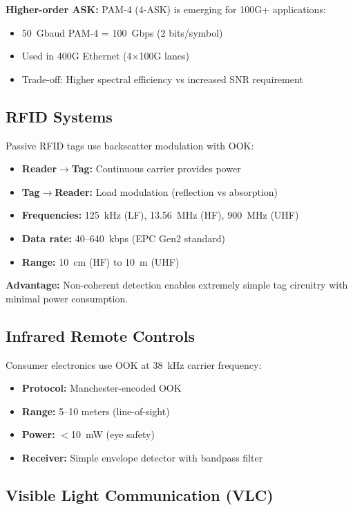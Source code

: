 \textbf{Higher-order ASK:} PAM-4 (4-ASK) is emerging for 100G+ applications:
\begin{itemize}
\item 50~Gbaud PAM-4 = 100~Gbps (2 bits/symbol)
\item Used in 400G Ethernet (4$\times$100G lanes)
\item Trade-off: Higher spectral efficiency vs increased SNR requirement
\end{itemize}

\subsection{RFID Systems}

Passive RFID tags use backscatter modulation with OOK:

\begin{itemize}
\item \textbf{Reader$\rightarrow$Tag:} Continuous carrier provides power
\item \textbf{Tag$\rightarrow$Reader:} Load modulation (reflection vs absorption)
\item \textbf{Frequencies:} 125~kHz (LF), 13.56~MHz (HF), 900~MHz (UHF)
\item \textbf{Data rate:} 40--640~kbps (EPC Gen2 standard)
\item \textbf{Range:} 10~cm (HF) to 10~m (UHF)
\end{itemize}

\textbf{Advantage:} Non-coherent detection enables extremely simple tag circuitry with minimal power consumption.

\subsection{Infrared Remote Controls}

Consumer electronics use OOK at 38~kHz carrier frequency:

\begin{itemize}
\item \textbf{Protocol:} Manchester-encoded OOK
\item \textbf{Range:} 5--10 meters (line-of-sight)
\item \textbf{Power:} $<$10~mW (eye safety)
\item \textbf{Receiver:} Simple envelope detector with bandpass filter
\end{itemize}

\subsection{Visible Light Communication (VLC)}

